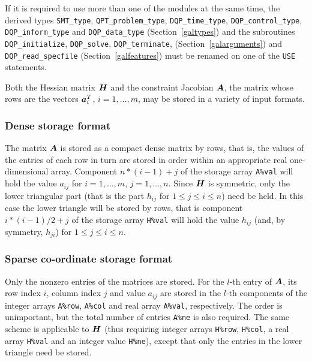 \documentclass{galahad}
\newcommand{\packagename}{DQP}
\begin{document}
\galhowto



\noindent
If it is required to use more than one of the modules at the same time, 
the derived types
{\tt SMT\_type},
{\tt QPT\_problem\_type},
{\tt \packagename\_time\_type},
{\tt \packagename\_control\_type},
{\tt \packagename\_inform\_type}
and
{\tt \packagename\_data\_type}
(Section~\ref{galtypes})
and the subroutines
{\tt \packagename\_initialize},
{\tt \packagename\_\-solve},
{\tt \packagename\_terminate},
(Section~\ref{galarguments})
and
{\tt \packagename\_read\_specfile}
(Section~\ref{galfeatures})
must be renamed on one of the {\tt USE} statements.


\galmatrix
Both the Hessian matrix ${\bm{H}}$ and
the constraint Jacobian ${\bm{A}}$, the matrix
whose rows are the vectors ${\bm{a}}_{i}^{T}$, $i = 1, \ldots , m$,
may be stored in a variety of input formats.

\subsubsection{Dense storage format}\label{dense}
The matrix ${\bm{A}}$ is stored as a compact
dense matrix by rows, that is, the values of the entries of each row in turn are
stored in order within an appropriate real one-dimensional array.
Component $n \ast (i-1) + j$ of the storage array {\tt A\%val} will hold the
value $a_{ij}$ for $i = 1, \ldots , m$, $j = 1, \ldots , n$.
Since ${\bm{H}}$ is symmetric, only the lower triangular part (that is the part
$h_{ij}$ for $1 \leq j \leq i \leq n$) need be held. In this case
the lower triangle will be stored by rows, that is
component $i \ast (i-1)/2 + j$ of the storage array {\tt H\%val}
will hold the value $h_{ij}$ (and, by symmetry, $h_{ji}$)
for $1 \leq j \leq i \leq n$.

\subsubsection{Sparse co-ordinate storage format}\label{coordinate}
Only the nonzero entries of the matrices are stored. For the
$l$-th entry of ${\bm{A}}$, its row index $i$, column index $j$
and value $a_{ij}$
are stored in the $l$-th components of the integer arrays {\tt A\%row},
{\tt A\%col} and real array {\tt A\%val}, respectively.
The order is unimportant, but the total
number of entries {\tt A\%ne} is also required.
The same scheme is applicable to
${\bm{H}}$ (thus requiring integer arrays {\tt H\%row}, {\tt H\%col}, a real array
{\tt H\%val} and an integer value {\tt H\%ne}),
except that only the entries in the lower triangle need be stored.
\end{document}
